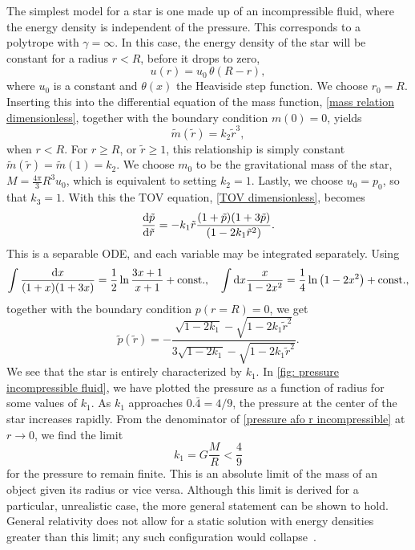 The simplest model for a star is one made up of an incompressible fluid, where the energy density is independent of the pressure.
This corresponds to a polytrope with $\gamma = \infty$.
In this case, the energy density of the star will be constant for a radius $r < R$, before it drops to zero,
%
\begin{equation}
    u(r) = u_0 \, \theta (R- r),
\end{equation}
%
where $u_0$ is a constant and $\theta(x)$ the Heaviside step function.
We choose $r_0 = R$.
Inserting this into the differential equation of the mass function, \autoref{mass relation dimensionless}, together with the boundary condition $m(0) = 0$, yields
%
\begin{equation}
    \tilde m(\tilde r) = k_2 \tilde r^3,
\end{equation}
%
when $r < R$.
For $r \geq R$, or $\tilde r \geq 1$, this relationship is simply constant $\tilde m(\tilde r) = \tilde m(1) = k_2$.
We choose $m_0$ to be the gravitational mass of the star, $M = \frac{4 \pi }{3} R^3 u_0$, which is equivalent to setting $k_2 = 1$.
Lastly, we choose $u_0 = p_0$, so that $k_3 = 1$.
With this the TOV equation, \autoref{TOV dimensionless}, becomes
%
\begin{equation} 
    \odv{\tilde p}{\tilde r} 
    = - k_1 \tilde r 
    \frac{(1 + \tilde p)(1 + 3 \tilde p)}{(1 - 2 k_1 \tilde r^2)}.
\end{equation}
%
This is a separable ODE, and each variable may be integrated separately.
Using
%
\begin{align}
    \int \frac{\dd x}{(1 + x)(1 + 3x)}
    = \frac{1}{2} \ln \frac{3x + 1}{x + 1} + \mathrm{const.} , \quad
    \int \dd x \frac{x}{1 - 2 x^2} 
    = \frac{1}{4}\ln\left(1 - 2 x^2 \right)
    + \mathrm{const.},
\end{align}
%
together with the boundary condition $p(r = R) = 0$, we get 
%
\begin{equation}
    \label{pressure afo r incompressible}
    \tilde p(\tilde r) 
    = 
    - \frac{\sqrt{1 - 2 k_1} - \sqrt{1 - 2 k_1 \tilde r^2}}
    {3 \sqrt{1 - 2 k_1 } - \sqrt{1 - 2 k_1 \tilde r^2}}.
\end{equation}
%
We see that the star is entirely characterized by $k_1$.
In \autoref{fig: pressure incompressible fluid}, we have plotted the pressure as a function of radius for some values of $k_1$.
As $k_1$ approaches $0.\bar 4 = 4/9$, the pressure at the center of the star increases rapidly.
From the denominator of \autoref{pressure afo r incompressible} at $r\rightarrow 0$, we find the limit
%
\begin{equation}
    \label{mass radius constraint}
    k_1 = G \frac{M}{R} < \frac{4}{9}
\end{equation}
%
for the pressure to remain finite.
This is an absolute limit of the mass of an object given its radius or vice versa.
Although this limit is derived for a particular, unrealistic case, the more general statement can be shown to hold.
General relativity does not allow for a static solution with energy densities greater than this limit; any such configuration would collapse~\autocite{carrollSpacetimeGeometryIntroduction2019}.


